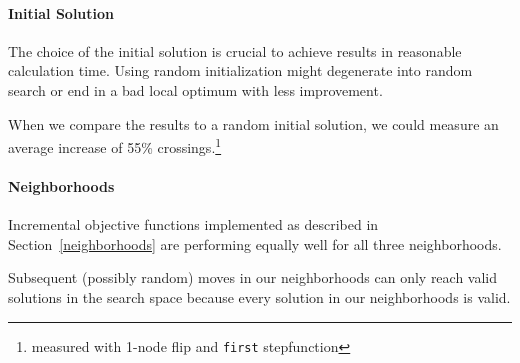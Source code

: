 \documentclass{scrartcl}
\begin{document}
\paragraph{Initial Solution}
The choice of the initial solution is crucial to achieve results in
reasonable calculation time.  Using random initialization might
degenerate into random search or end in a bad local optimum with less
improvement.



When we compare the results to a random initial solution, we could
measure an average increase of 55\% crossings.\footnote{measured with 1-node flip and \texttt{first} stepfunction}
%

%




\paragraph{Neighborhoods}
Incremental objective functions implemented as described in Section~\ref{neighborhoods}
are performing equally well for all three neighborhoods.

Subsequent (possibly random) moves in our neighborhoods can only reach
valid solutions in the search space because every solution in our neighborhoods
is valid.
\end{document}
